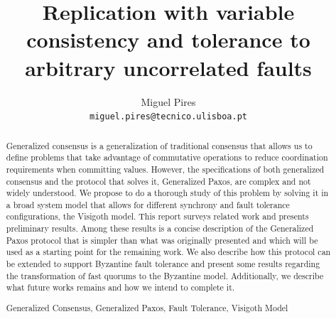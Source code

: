 \documentclass[runningheads,a4paper]{llncs}
\newcommand{\keywords}[1]{\par\addvspace\baselineskip
\noindent\keywordname\enspace\ignorespaces#1}
\begin{document}
\mainmatter  %

\title{Replication with variable consistency and tolerance to arbitrary uncorrelated faults}

\author{Miguel Pires \\
\texttt{miguel.pires@tecnico.ulisboa.pt}}



%
%

\let\oldaddcontentsline\addcontentsline
\def\addcontentsline#1#2#3{}
\maketitle
\def\addcontentsline#1#2#3{\oldaddcontentsline{#1}{#2}{#3}}


\begin{abstract}
Generalized consensus is a generalization of traditional consensus that allows us to define problems that take advantage of commutative operations to reduce coordination requirements when committing values. However, the specifications of both generalized consensus and the protocol that solves it, Generalized Paxos, are complex and not widely understood. We propose to do a thorough study of this problem by solving it in a broad system model that allows for different synchrony and fault tolerance configurations, the Visigoth model. This report surveys related work and presents preliminary results. Among these results is a concise description of the Generalized Paxos protocol that is simpler than what was originally presented and which will be used as a starting point for the remaining work. We also describe how this protocol can be extended to support Byzantine fault tolerance and present some results regarding the transformation of fast quorums to the Byzantine model. Additionally, we describe what future works remains and how we intend to complete it.

\keywords{Generalized Consensus, Generalized Paxos, Fault Tolerance, Visigoth Model}
\end{abstract}
\end{document}
